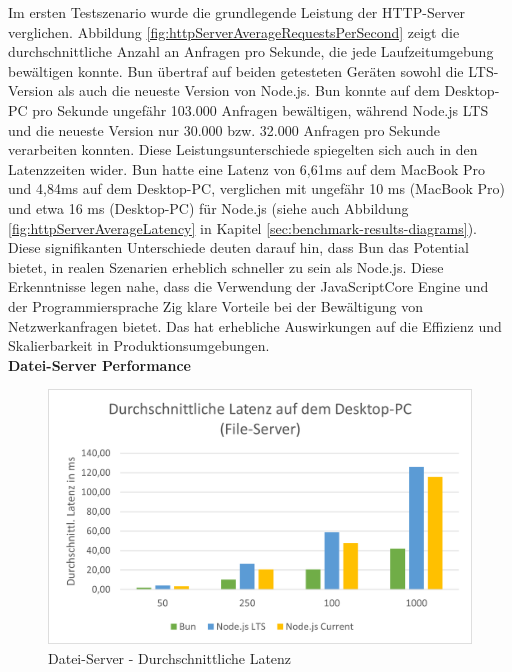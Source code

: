 \noindent
Im ersten Testszenario wurde die grundlegende Leistung der HTTP-Server verglichen. Abbildung \ref{fig:httpServerAverageRequestsPerSecond} zeigt die durchschnittliche Anzahl an Anfragen pro Sekunde, die jede Laufzeitumgebung bewältigen konnte. Bun übertraf auf beiden getesteten Geräten sowohl die LTS-Version als auch die neueste Version von Node.js. Bun konnte auf dem Desktop-PC pro Sekunde ungefähr 103.000 Anfragen bewältigen, während Node.js LTS und die neueste Version nur 30.000 bzw. 32.000 Anfragen pro Sekunde verarbeiten konnten. Diese Leistungsunterschiede spiegelten sich auch in den Latenzzeiten wider. Bun hatte eine Latenz von 6,61ms auf dem MacBook Pro und 4,84ms auf dem Desktop-PC, verglichen mit ungefähr 10 ms (MacBook Pro) und etwa 16 ms (Desktop-PC) für Node.js (siehe auch Abbildung \ref{fig:httpServerAverageLatency} in Kapitel \ref{sec:benchmark-results-diagrams}).\newline
Diese signifikanten Unterschiede deuten darauf hin, dass Bun das Potential bietet, in realen Szenarien erheblich schneller zu sein als Node.js. Diese Erkenntnisse legen nahe, dass die Verwendung der JavaScriptCore Engine und der Programmiersprache Zig klare Vorteile bei der Bewältigung von Netzwerkanfragen bietet. Das hat erhebliche Auswirkungen auf die Effizienz und Skalierbarkeit in Produktionsumgebungen.\\

\noindent
\textbf{Datei-Server Performance}
\begin{figure}[h!]
	\centering
	\includegraphics[width=\linewidth]{./images/fileServerAverageLatencyDesktop.png}
	\caption{Datei-Server - Durchschnittliche Latenz}
	\label{fig:fileServerAverageLatency}
\end{figure}

